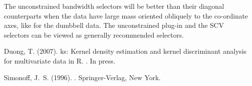 \documentclass[a4paper,11pt]{article}
\let\pkg=\texttt
\begin{document}
The unconstrained bandwidth selectors will be better than their diagonal counterparts
when the data have large mass oriented obliquely to the co-ordinate axes,
like for the dumbbell data. 
The unconstrained plug-in and the SCV selectors
can be viewed as generally recommended selectors.





\begin{thebibliography}{}


Duong, T. (2007).
\newblock ks: {K}ernel density estimation and kernel discriminant analysis for
  multivariate data in {R}.
. In press.


Simonoff, J.~S. (1996).
.
\newblock Springer-Verlag, New York.

\end{thebibliography}
\end{document}
